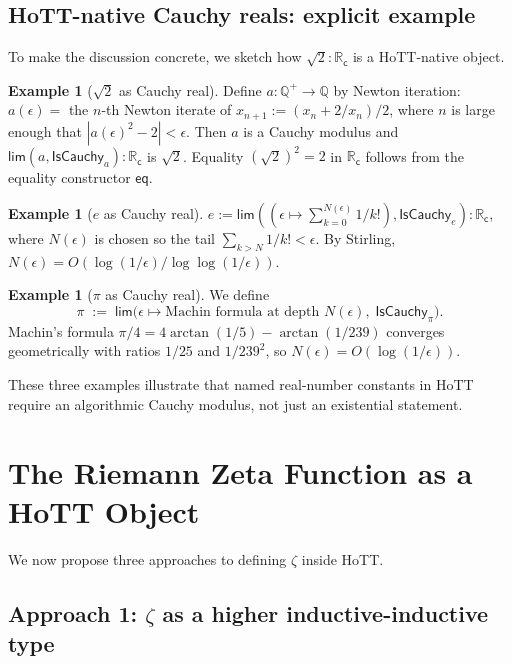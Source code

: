 \documentclass[12pt]{article}
\theoremstyle{definition}
\newtheorem{example}[theorem]{Example}
\theoremstyle{remark}
\newcommand{\R}{\mathbb{R}}
\newcommand{\Q}{\mathbb{Q}}
\newcommand{\Rc}{\R_{\mathsf{c}}}
\begin{document}
\subsection{HoTT-native Cauchy reals: explicit example}\label{subsec:CauchyEx}

To make the discussion concrete, we sketch how $\sqrt{2}:\Rc$ is a
HoTT-native object.

\begin{example}[$\sqrt{2}$ as Cauchy real]\label{ex:sqrt2}
Define $a:\Q^+ \to \Q$ by Newton iteration: $a(\epsilon) = $ the $n$-th
Newton iterate of $x_{n+1} := (x_n + 2/x_n)/2$, where $n$ is large enough
that $|a(\epsilon)^2 - 2| < \epsilon$. Then $a$ is a Cauchy modulus and
$\mathsf{lim}(a, \mathsf{IsCauchy}_a):\Rc$ is $\sqrt{2}$. Equality
$(\sqrt{2})^2 = 2$ in $\Rc$ follows from the equality constructor
$\mathsf{eq}$.
\end{example}

\begin{example}[$e$ as Cauchy real]\label{ex:euler}
$e := \mathsf{lim}((\epsilon \mapsto \sum_{k=0}^{N(\epsilon)} 1/k!),
\mathsf{IsCauchy}_e):\Rc$, where $N(\epsilon)$ is chosen so the tail
$\sum_{k>N} 1/k! < \epsilon$. By Stirling, $N(\epsilon) = O(\log(1/\epsilon)/
\log\log(1/\epsilon))$.
\end{example}

\begin{example}[$\pi$ as Cauchy real]\label{ex:pi}
We define
\[
\pi \;:=\; \mathsf{lim}\!\bigl(
   \epsilon \mapsto \text{Machin formula at depth $N(\epsilon)$},\;
   \mathsf{IsCauchy}_\pi\bigr).
\]
Machin's formula $\pi/4 = 4\arctan(1/5) - \arctan(1/239)$ converges
geometrically with ratios $1/25$ and $1/239^2$, so
$N(\epsilon) = O(\log(1/\epsilon))$.
\end{example}

These three examples illustrate that named real-number constants in HoTT
require an algorithmic Cauchy modulus, not just an existential statement.

\section{The Riemann Zeta Function as a HoTT Object}\label{sec:zeta}

We now propose three approaches to defining $\zeta$ inside HoTT.

\subsection{Approach 1: \texorpdfstring{$\zeta$}{zeta} as a higher inductive-inductive type}
\end{document}
